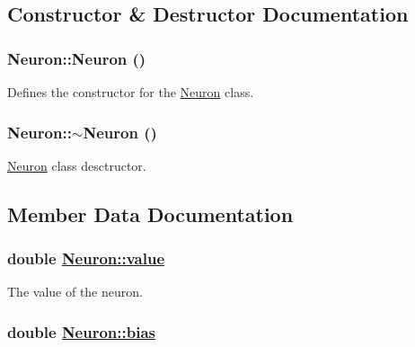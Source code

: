 \subsection{Constructor \& Destructor Documentation}
\hypertarget{classNeuron_823487d01615fadb8ac19a2768dd9d96}{
\subsubsection[Neuron]{\setlength{\rightskip}{0pt plus 5cm}Neuron::Neuron ()}}
\label{classNeuron_823487d01615fadb8ac19a2768dd9d96}


Defines the constructor for the \hyperlink{classNeuron}{Neuron} class. \hypertarget{classNeuron_94a250ce7e167760e593979b899745b1}{
\subsubsection[$\sim$Neuron]{\setlength{\rightskip}{0pt plus 5cm}Neuron::$\sim$Neuron ()}}
\label{classNeuron_94a250ce7e167760e593979b899745b1}


\hyperlink{classNeuron}{Neuron} class desctructor. 

\subsection{Member Data Documentation}
\hypertarget{classNeuron_e1988ffe53bfd53ce979aecf01a164e3}{
\subsubsection[value]{\setlength{\rightskip}{0pt plus 5cm}double \hyperlink{classNeuron_e1988ffe53bfd53ce979aecf01a164e3}{Neuron::value}}}
\label{classNeuron_e1988ffe53bfd53ce979aecf01a164e3}


The value of the neuron. \hypertarget{classNeuron_7dc59218069023c3b8348a353902b0ac}{
\subsubsection[bias]{\setlength{\rightskip}{0pt plus 5cm}double \hyperlink{classNeuron_7dc59218069023c3b8348a353902b0ac}{Neuron::bias}}}
\label{classNeuron_7dc59218069023c3b8348a353902b0ac}


